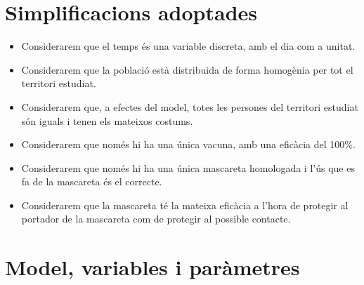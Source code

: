 \documentclass[a4paper, 11pt]{article}
\begin{document}
\section{Simplificacions adoptades}
  \begin{itemize}
    \item Considerarem que el temps és una variable discreta, amb el dia com a unitat.
    \item Considerarem que la població està distribuida de forma homogènia per tot el territori estudiat.
    \item Considerarem que, a efectes del model, totes les persones del territori estudiat són iguals i tenen els mateixos costums.
    \item Considerarem que només hi ha una única vacuna, amb una eficàcia del 100\%.
    \item Considerarem que només hi ha una única mascareta homologada i l'ús que es fa de la mascareta és el correcte.
    \item Considerarem que la mascareta té la mateixa eficàcia a l'hora de protegir al portador de la mascareta com de protegir al possible contacte.
  \end{itemize}
\section{Model, variables i paràmetres}
\end{document}
